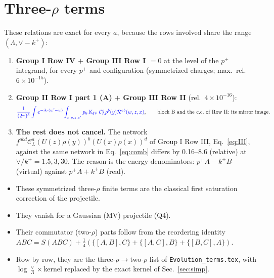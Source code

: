 \documentclass[10pt]{article}
\numberwithin{equation}{section}
\newcommand{\new}[1]{{\color{blue}#1}}
\newcommand{\CL}{\mathcal C_L}
\newcommand{\Rc}{\mathcal R}
\newcommand{\pre}{\frac{1}{(2\pi)^3}}
\newcommand{\phw}{e^{-ik\cdot(w'-w)}}
\begin{document}
\section{Three-\texorpdfstring{$\rho$}{rho} terms}\label{sec:three}
These relations are exact for every $a$, because the rows involved share the range $(\Lambda,\vee-k^+)$:
\begin{enumerate}
\item \textbf{Group I Row IV $+$ Group III Row I $=0$} at the level of the $p^+$ integrand, for every $p^+$ and configuration (symmetrized charges; max.\ rel.\ $6\times10^{-15}$).
\item \textbf{Group II Row I part 1 (A) $+$ Group III Row II} (rel.\ $4\times10^{-16}$):
\begin{equation}
\new{\pre\int\phw\int_{x,y,z,x'}p_8\,\mathbb K_{\rm IV}\;\CL^a\rho^b(y)\Rc^{ab}(w,z,x)},\qquad\text{block B and the c.c.\ of Row II: its mirror image.}
\label{eq:comb}
\end{equation}
\item \textbf{The rest does not cancel.} The network $f^{abd}\CL^a(U(z)\rho(y))^b(U(x)\rho(x))^d$ of Group I Row III, Eq.~\eqref{eq:III}, against the same network in Eq.~\eqref{eq:comb} differs by 0.16--8.6 (relative) at $\vee/k^+=1.5,3,30$. The reason is the energy denominators: $p^+A-k^+B$ (virtual) against $p^+A+k^+B$ (real).
\end{enumerate}
\begin{itemize}
\item These symmetrized three-$\rho$ finite terms are the classical first saturation correction of the projectile.
\item They vanish for a Gaussian (MV) projectile (Q4).
\item Their commutator (two-$\rho$) parts follow from the reordering identity $ABC=S(ABC)+\frac14(\{[A,B],C\}+\{[A,C],B\}+\{[B,C],A\})$.
\item Row by row, they are the three-$\rho\to$two-$\rho$ list of \texttt{Evolution\_terms.tex}, with $\log\frac\vee\Lambda\times$kernel replaced by the exact kernel of Sec.~\ref{sec:simp}.
\end{itemize}

\end{document}

